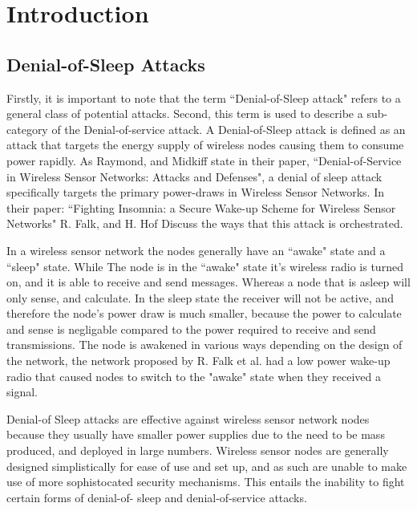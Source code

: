 \section{Introduction}

\subsection{Denial-of-Sleep Attacks}
 
Firstly, it is important to note that the term ``Denial-of-Sleep attack" refers to a general class of potential attacks. Second, this term is used to describe a sub-category of the Denial-of-service attack. A Denial-of-Sleep 
attack is defined as an attack that targets the energy supply of wireless nodes causing them to consume power rapidly. As Raymond, and Midkiff state in their paper, ``Denial-of-Service in Wireless Sensor Networks: 
Attacks and Defenses", a denial of sleep attack specifically targets the primary power-draws in Wireless Sensor Networks\cite{4431860}. In their paper: ``Fighting Insomnia: a Secure Wake-up Scheme for Wireless Sensor Networks" 
R. Falk, and H. Hof Discuss the ways that this attack is orchestrated\cite{5211020}. 

In a wireless sensor network the nodes generally have an ``awake" state and a ``sleep" state\cite{5211020}. While The node is in the ``awake" state it's wireless radio is turned on, and it is able to receive and send messages. 
Whereas a node that is asleep will only  sense, and calculate. In the sleep state the receiver will not be active, and therefore the node's power draw is much smaller, because the power to calculate and sense is negligable 
compared to the power required to receive and send transmissions. The node is awakened in various ways depending on the design of the network, the network proposed by R. Falk et al. had a low power wake-up radio that caused nodes
to switch to the "awake" state when they received a signal. 

Denial-of Sleep attacks are effective against wireless sensor network nodes because they usually have smaller power supplies due to the need to be mass produced, and deployed in large numbers\cite{4602623}. Wireless sensor 
nodes are generally designed simplistically for ease of use and set up, and as such are unable to make use of more sophistocated security mechanisms\cite{4476299}. This entails the inability to fight certain forms of denial-of-
sleep and denial-of-service attacks.


